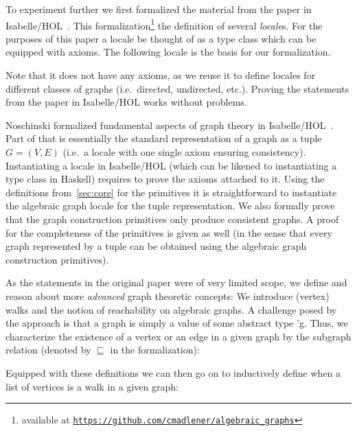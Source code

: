 \documentclass{article}
\newcommand*{\term}[1]{{\isaspacing\isastyle }}
\newcommand*{\Term}[1]{{\isaspacing\isastyle #1}}
\begin{document}
To experiment further we first formalized the material from the paper in
Isabelle/HOL~\cite{isabelle}.
This formalization\footnote{available at
  \texttt{\href{https://github.com/cmadlener/algebraic_graphs}{https://github.com/cmadlener/algebraic\_graphs}}}
the definition of several \textit{locale}s. For the purposes of this paper a
locale be thought of as a type class which can be equipped with axioms. The
following locale is the basis for our formalization.

\vspace{3mm}
\term{terms/locale_primitives}
\vspace{3mm}\newline
Note that it does not have any
axioms, as we reuse it to define locales for different classes of graphs (i.e.\
directed, undirected, etc.). Proving the statements from the paper in Isabelle/HOL works
without problems.

Noschinski formalized fundamental aspects of graph theory in
Isabelle/HOL~\cite{GraphTheory-AFP}. Part of that is essentially the standard
representation of a graph as a tuple $G=(V,E)$ (i.e.\ a locale with one single
axiom ensuring consistency). Instantiating a locale in Isabelle/HOL (which can be likened to
instantiating a type class in Haskell) requires to prove the axioms attached to
it. Using the definitions from~\autoref{sec:core} for the primitives it is
straightforward to instantiate the algebraic graph locale for the tuple
representation. We also formally prove that the graph construction primitives only
produce consistent graphs. A proof for the completeness of the primitives is
given as well (in the sense that every graph represented by a tuple can be
obtained using the algebraic graph construction primitives).

As the statements in the original paper were of very limited scope, we 
define and reason about more \textit{advanced} graph theoretic concepts: We
introduce (vertex) walks and the notion of reachability on algebraic graphs. A
challenge posed by the approach is that a graph is simply a value of some
abstract type \Term{'g}. Thus, we characterize the existence of a vertex or an
edge in a given graph by the subgraph relation (denoted by $\sqsubseteq$ in the
formalization):

\vspace{3mm}
\term{terms/has_elem}
\vspace{3mm}\newline
Equipped with these definitions we can then go on to inductively define when a
list of vertices is a walk in a given graph:
\end{document}
